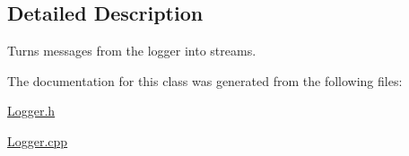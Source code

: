 \subsection{Detailed Description}
Turns messages from the logger into streams. 

The documentation for this class was generated from the following files\+:\begin{DoxyCompactItemize}
\item 
\hyperlink{_logger_8h}{Logger.\+h}\item 
\hyperlink{_logger_8cpp}{Logger.\+cpp}\end{DoxyCompactItemize}
